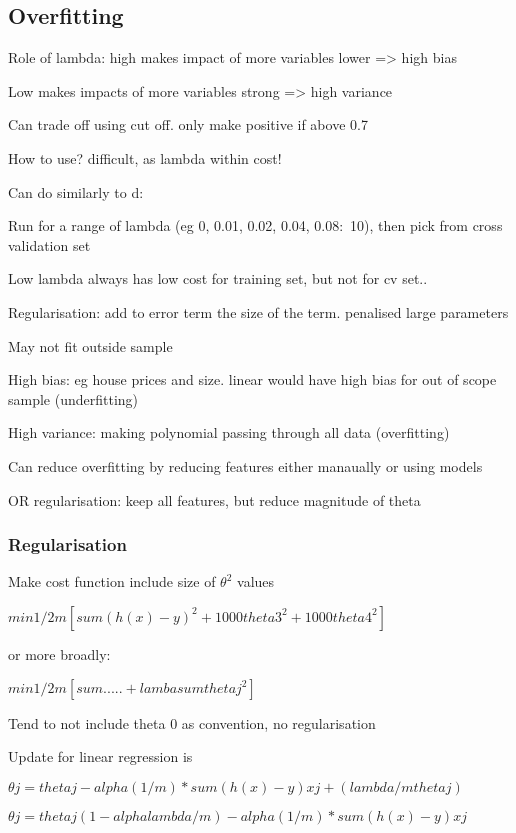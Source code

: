 
\subsection{Overfitting}

Role of lambda: high makes impact of more variables lower => high bias

Low makes impacts of more variables strong => high variance

Can trade off using cut off. only make positive if above 0.7

How to use? difficult, as lambda within cost!

Can do similarly to d:

Run for a range of lambda (eg 0, 0.01, 0.02, 0.04, 0.08:~10), then pick from cross validation set

Low lambda always has low cost for training set, but not for cv set..

Regularisation: add to error term the size of the term. penalised large parameters

May not fit outside sample

High bias: eg house prices and size. linear would have high bias for out of scope sample (underfitting)

High variance: making polynomial passing through all data (overfitting)

Can reduce overfitting by reducing features either manaually or using models

OR regularisation: keep all features, but reduce magnitude of theta

\subsubsection{Regularisation}

Make cost function include size of \(\theta^2\) values

\(min 1/2m [sum (h(x)-y)^2 + 1000 theta3 ^2 + 1000 theta4 ^2]\)

or more broadly:

\(min 1/2m[sum ..... + lamba sum thetaj^2]\)

Tend to not include theta 0 as convention, no regularisation

Update for linear regression is

\(\theta j = theta j -alpha{(1/m)* sum(h(x)-y)xj + (lambda/m thetaj)}\)

\(\theta j = theta j (1- alpha lambda / m) -alpha {(1/m)*sum(h(x)-y)xj}\)

